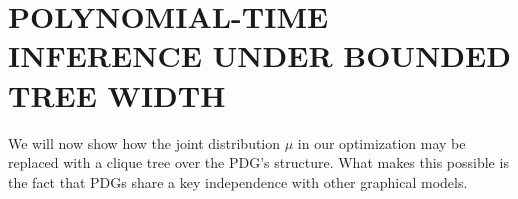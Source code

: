 \documentclass[twoside]{article}
\begin{document}
\section{POLYNOMIAL-TIME INFERENCE UNDER BOUNDED TREE WIDTH}
    \label{sec:clique-tree-expcone}

We will now show how the joint distribution $\mu$ in our optimization may be replaced
with a clique tree over the PDG's structure. What makes this possible is the fact that
PDGs share a key independence with other graphical models.
\end{document}
